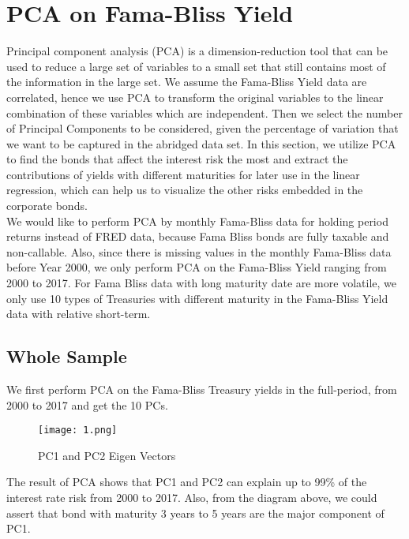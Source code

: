 \documentclass[12pt]{article}
\begin{document}
\pagestyle{fancyplain}
\cfoot{}

\section{PCA on Fama-Bliss Yield}

Principal component analysis (PCA) is a
dimension-reduction tool that can be used to
reduce a large set of variables to a small set
that still contains most of the information in
the large set. We assume the Fama-Bliss Yield data are correlated, hence we use PCA to transform the original variables to the linear combination of these variables which are independent. Then we select the number of Principal Components to be considered, given the percentage of variation that we want to be captured in the abridged data set. In this section, we utilize PCA to find the bonds that affect the interest risk the most and extract the contributions of yields with different maturities for later use in the linear regression, which can help us to visualize the other risks embedded in the corporate bonds.\\


 We would like to perform PCA by monthly Fama-Bliss data for holding period returns instead of FRED data, because Fama Bliss bonds are fully taxable and non-callable. Also, since there is missing values in the monthly Fama-Bliss data before Year 2000, we only perform PCA on the Fama-Bliss Yield ranging from 2000 to 2017. For Fama Bliss data with long maturity date are more volatile, we only use 10 types of Treasuries with different maturity in the Fama-Bliss Yield data with relative short-term. 


\subsection{Whole Sample}

We first perform PCA on the Fama-Bliss Treasury yields in the full-period, from 2000 to 2017 and get the 10 PCs.

\begin{figure}[H]
\centering
\texttt{[image: 1.png]}\\
\caption{PC1 and PC2 Eigen Vectors}
\end{figure}


The result of PCA shows that PC1 and PC2 can explain up to 99\% of the interest rate risk from 2000 to 2017. Also, from the diagram above, we could assert that bond with maturity 3 years to 5 years are the major component of PC1.
\end{document}
